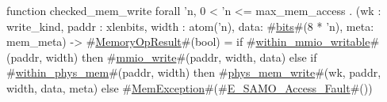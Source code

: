 function checked_mem_write forall 'n, 0 < 'n <= max_mem_access . (wk : write_kind, paddr : xlenbits, width : atom('n), data: #\hyperref[sailRISCVzbits]{bits}#(8 * 'n), meta: mem_meta) -> #\hyperref[sailRISCVzMemoryOpResult]{MemoryOpResult}#(bool) =
  if   #\hyperref[sailRISCVzwithinzymmiozywritable]{within\_mmio\_writable}#(paddr, width)
  then #\hyperref[sailRISCVzmmiozywrite]{mmio\_write}#(paddr, width, data)
  else if #\hyperref[sailRISCVzwithinzyphyszymem]{within\_phys\_mem}#(paddr, width)
  then #\hyperref[sailRISCVzphyszymemzywrite]{phys\_mem\_write}#(wk, paddr, width, data, meta)
  else #\hyperref[sailRISCVzMemException]{MemException}#(#\hyperref[sailRISCVzEzySAMOzyAccesszyFault]{E\_SAMO\_Access\_Fault}#())
